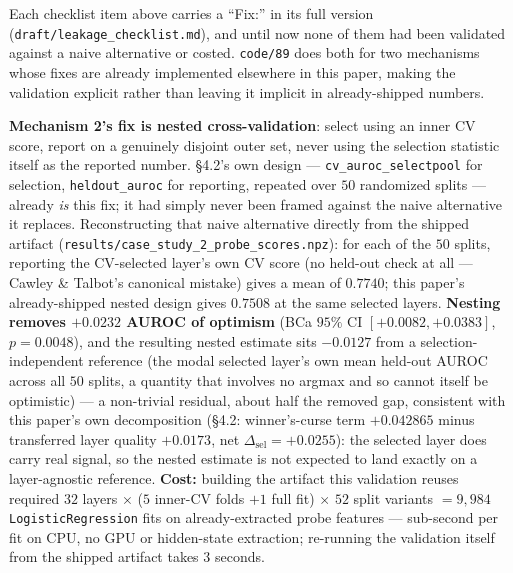 \documentclass[10pt]{article} %
\begin{document}
Each checklist item above carries a ``Fix:'' in its full version
(\texttt{draft/leakage\_checklist.md}), and until now none of them had been
validated against a naive alternative or costed. \texttt{code/89} does both
for two mechanisms whose fixes are already implemented elsewhere in this
paper, making the validation explicit rather than leaving it implicit in
already-shipped numbers.

\textbf{Mechanism 2's fix is nested cross-validation}: select using an inner
CV score, report on a genuinely disjoint outer set, never using the selection
statistic itself as the reported number. \S4.2's own design ---
\texttt{cv\_auroc\_selectpool} for selection, \texttt{heldout\_auroc} for
reporting, repeated over $50$ randomized splits --- already \emph{is} this
fix; it had simply never been framed against the naive alternative it
replaces. Reconstructing that naive alternative directly from the shipped
artifact (\texttt{results/case\_study\_2\_probe\_scores.npz}): for each of the
$50$ splits, reporting the CV-selected layer's own CV score (no held-out check
at all --- Cawley \& Talbot's canonical mistake) gives a mean of $0.7740$;
this paper's already-shipped nested design gives $0.7508$ at the same
selected layers. \textbf{Nesting removes $+0.0232$ AUROC of optimism} (BCa
$95\%$ CI $[+0.0082,+0.0383]$, $p=0.0048$), and the resulting nested estimate
sits $-0.0127$ from a selection-independent reference (the modal
selected layer's own mean held-out AUROC across all $50$ splits, a quantity
that involves no argmax and so cannot itself be optimistic) --- a non-trivial
residual, about half the removed gap, consistent with this paper's own
decomposition (\S4.2: winner's-curse term $+0.042865$ minus transferred layer
quality $+0.0173$, net $\Delta_{\text{sel}}=+0.0255$): the selected layer does
carry real signal, so the nested estimate is not expected to land exactly on
a layer-agnostic reference. \textbf{Cost:} building the artifact this
validation reuses required $32$ layers $\times$ ($5$ inner-CV folds $+1$ full
fit) $\times$ $52$ split variants $=9{,}984$ \texttt{LogisticRegression} fits
on already-extracted probe features --- sub-second per fit on CPU, no GPU or
hidden-state extraction; re-running the validation itself from the shipped
artifact takes $3$ seconds.
\end{document}
